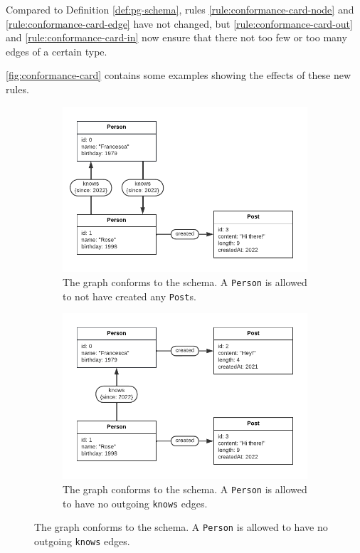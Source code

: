 \documentclass{article}
\begin{document}
Compared to Definition \ref{def:pg-schema}, rules \ref{rule:conformance-card-node} and \ref{rule:conformance-card-edge} have not changed, but \ref{rule:conformance-card-out} and \ref{rule:conformance-card-in} now ensure that there not too few or too many edges of a certain type.

\autoref{fig:conformance-card} contains some examples showing the effects of these new rules.

\begin{figure}[t]
  \centering
  \begin{subfigure}[t]{0.45\textwidth}
    \centering
    \includegraphics[width=\textwidth]{figures/conformance-card-out.pdf}
    \caption{The graph conforms to the schema. A \texttt{Person} is allowed to not have created any \texttt{Post}s.}
    \label{fig:conformance-card-node}
  \end{subfigure}
  \hfill
  \begin{subfigure}[t]{0.45\textwidth}
    \centering
    \includegraphics[width=\textwidth]{figures/conformance-card-out-2.pdf}
    \caption{The graph conforms to the schema. A \texttt{Person} is allowed to have no outgoing \texttt{knows} edges.}
    \label{fig:conformance-card-edge}
  \end{subfigure}


\end{figure}
\end{document}
